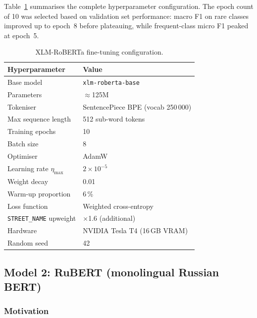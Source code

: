 Table~\ref{tab:xlmr_config} summarises the complete hyperparameter configuration. The epoch count of 10 was selected based on validation set performance: macro F1 on rare classes improved up to epoch~8 before plateauing, while frequent-class micro F1 peaked at epoch~5.

\begin{table}[H]
\centering
\caption{XLM-RoBERTa fine-tuning configuration.}
\label{tab:xlmr_config}
\renewcommand{\arraystretch}{1.3}
\begin{tabular}{ll}
\toprule
\textbf{Hyperparameter}        & \textbf{Value} \\
\midrule
Base model                     & \texttt{xlm-roberta-base}~\cite{conneau2020xlmr} \\
Parameters                     & $\approx$125M \\
Tokeniser                      & SentencePiece BPE (vocab 250\,000) \\
Max sequence length            & 512 sub-word tokens \\
Training epochs                & 10 \\
Batch size                     & 8 \\
Optimiser                      & AdamW \\
Learning rate $\eta_{\max}$    & $2 \times 10^{-5}$ \\
Weight decay                   & 0.01 \\
Warm-up proportion             & 6\,\% \\
Loss function                  & Weighted cross-entropy \\
\texttt{STREET\_NAME} upweight & $\times$1.6 (additional) \\
Hardware                       & NVIDIA Tesla T4 (16\,GB VRAM) \\
Random seed                    & 42 \\
\bottomrule
\end{tabular}
\end{table}

\subsection{Model 2: RuBERT (monolingual Russian BERT)}
\label{sec:rubert}

\subsubsection{Motivation}

